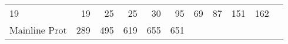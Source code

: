 \documentclass[]{article}
\begin{document}
\begin{longtable}[]{@{}lrrrrrrrrrr@{}}
\begin{minipage}[t]{0.04\columnwidth}
19\strut
\end{minipage} & \begin{minipage}[t]{0.05\columnwidth}\raggedleft\strut
19\strut
\end{minipage} & \begin{minipage}[t]{0.05\columnwidth}\raggedleft\strut
25\strut
\end{minipage} & \begin{minipage}[t]{0.05\columnwidth}\raggedleft\strut
25\strut
\end{minipage} & \begin{minipage}[t]{0.05\columnwidth}\raggedleft\strut
30\strut
\end{minipage} & \begin{minipage}[t]{0.05\columnwidth}\raggedleft\strut
95\strut
\end{minipage} & \begin{minipage}[t]{0.06\columnwidth}\raggedleft\strut
69\strut
\end{minipage} & \begin{minipage}[t]{0.06\columnwidth}\raggedleft\strut
87\strut
\end{minipage} & \begin{minipage}[t]{0.04\columnwidth}\raggedleft\strut
151\strut
\end{minipage} & \begin{minipage}[t]{0.11\columnwidth}\raggedleft\strut
162\strut
\end{minipage}\tabularnewline
\begin{minipage}[t]{0.14\columnwidth}\raggedright\strut
Mainline Prot\strut
\end{minipage} & \begin{minipage}[t]{0.04\columnwidth}\raggedleft\strut
289\strut
\end{minipage} & \begin{minipage}[t]{0.05\columnwidth}\raggedleft\strut
495\strut
\end{minipage} & \begin{minipage}[t]{0.05\columnwidth}\raggedleft\strut
619\strut
\end{minipage} & \begin{minipage}[t]{0.05\columnwidth}\raggedleft\strut
655\strut
\end{minipage} & \begin{minipage}[t]{0.05\columnwidth}\raggedleft\strut
651\strut
\end{minipage} & \begin{minipage}[t]{0.05\columnwidth}\raggedleft\strut

\end{minipage}
\end{longtable}
\end{document}
